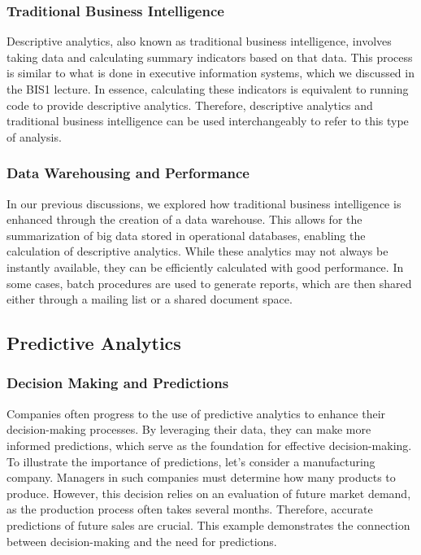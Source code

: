 \subsubsection{Traditional Business Intelligence}

Descriptive analytics, also known as traditional business intelligence,
involves taking data and calculating summary indicators based on that
data. This process is similar to what is done in executive information
systems, which we discussed in the BIS1 lecture. In essence, calculating
these indicators is equivalent to running code to provide descriptive
analytics. Therefore, descriptive analytics and traditional business
intelligence can be used interchangeably to refer to this type of
analysis.

\subsubsection{Data Warehousing and Performance}

In our previous discussions, we explored how traditional business
intelligence is enhanced through the creation of a data warehouse. This
allows for the summarization of big data stored in operational
databases, enabling the calculation of descriptive analytics. While
these analytics may not always be instantly available, they can be
efficiently calculated with good performance. In some cases, batch
procedures are used to generate reports, which are then shared either
through a mailing list or a shared document space.

\subsection{Predictive Analytics}

\subsubsection{Decision Making and Predictions}

Companies often progress to the use of predictive analytics to enhance
their decision-making processes. By leveraging their data, they can make
more informed predictions, which serve as the foundation for effective
decision-making. To illustrate the importance of predictions, let's
consider a manufacturing company. Managers in such companies must
determine how many products to produce. However, this decision relies on
an evaluation of future market demand, as the production process often
takes several months. Therefore, accurate predictions of future sales
are crucial. This example demonstrates the connection between
decision-making and the need for predictions.


